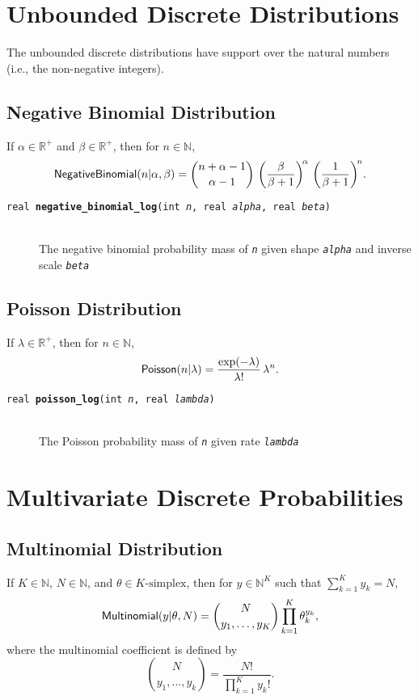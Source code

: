 \documentclass[10pt]{report}
\newcommand{\distro}[1]{\mbox{\sf #1}}
\newcommand{\posreals}{\mathbb{R}^+}
\newcommand{\nats}{\mathbb{N}}
\newcommand{\fitem}[4]{\item[{\tt #1 {\bfseries #2}(#3)}]\mbox{ } \\[4pt] #4}
\newcommand{\farg}[1]{{\tt\slshape #1}}
\begin{document}
\section{Unbounded Discrete Distributions}

The unbounded discrete distributions have support over the natural
numbers (i.e., the non-negative integers).

\subsection{Negative Binomial Distribution}

If $\alpha \in \posreals$ and $\beta \in \posreals$, then for $n \in
\nats$,
\[
\distro{NegativeBinomial}(n|\alpha,\beta)
= 
{{n + \alpha - 1} \choose {\alpha - 1}}
\,
\left( \frac{\beta}{\beta+1} \right)^{\!\alpha}
\,
\left( \frac{1}{\beta + 1} \right)^{\!n} \!.
\]

\begin{description}
%
 \fitem{real}{negative\_binomial\_log}{int \farg{n}, real
   \farg{alpha}, real \farg{beta}}{The negative binomial probability
   mass of \farg{n} given shape \farg{alpha} and inverse scale \farg{beta}}
%
\end{description}


\subsection{Poisson Distribution}

If $\lambda \in \posreals$, then for $n \in \nats$,
\[
\distro{Poisson}(n|\lambda)
= 
\frac{\exp(-\lambda)}{\lambda!}
\,
\lambda^n.
\]

\begin{description}
 \fitem{real}{poisson\_log}{int \farg{n}, real \farg{lambda}}{ The
    Poisson probability mass of \farg{n} given rate \farg{lambda}}
\end{description}




\section{Multivariate Discrete Probabilities}

\subsection{Multinomial Distribution}

If $K \in \nats$, $N \in \nats$, and $\theta \in \mbox{$K$-simplex}$,
then for $y \in \nats^K$ such that $\sum_{k=1}^K y_k = N$,
%
\[
\distro{Multinomial}(y|\theta,N)
= {N \choose {y_1,\ldots,y_K}} 
\prod_{k=1}^K \theta_k^{y_k},
\]
where the multinomial coefficient is defined by
\[
{N \choose {y_1,\ldots,y_k}}
= \frac{N!}{\prod_{k=1}^K y_k!}.
\]
\end{document}
